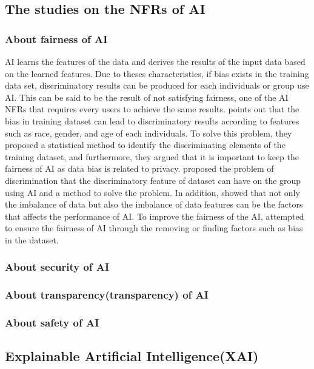 \documentclass[journal,article,submit,moreauthors,pdftex]{Definitions/mdpi}
\begin{document}
\subsection{The studies on the NFRs of AI}
\subsubsection{About fairness of AI}

AI learns the features of the data and derives the results of the input data based on the learned features.
Due to theses characteristics, if bias exists in the training data set, discriminatory results can be produced for each individuals or group use AI.
This can be said to be the result of not satisfying fairness, one of the AI NFRs that requires every users to achieve the same results.
\cite{fairness-dwork, fairness-zemel} points out that the bias in training dataset can lead to discriminatory results according to features such as race, gender, and age of each individuals.
To solve this problem, they proposed a statistical method to identify the discriminating elements of the training dataset, and furthermore, they argued that it is important to keep the fairness of AI as data bias is related to privacy.
\cite{fairness-feldman} proposed the problem of discrimination that the discriminatory feature of dataset can have on the group using AI and a method to solve the problem.
In addition, \cite{fairness-zhang} showed that not only the imbalance of data but also the imbalance of data features can be the factors that affects the performance of AI.
To improve the fairness of the AI, \cite{fairness-feldman,fairness-microsoft, fairness-tramer} attempted to ensure the fairness of AI through the removing or finding factors such as bias in the dataset.

\subsubsection{About security of AI}
\subsubsection{About transparency(transparency) of AI}
\subsubsection{About safety of AI}

\subsection{Explainable Artificial Intelligence(XAI)} %
\end{document}
